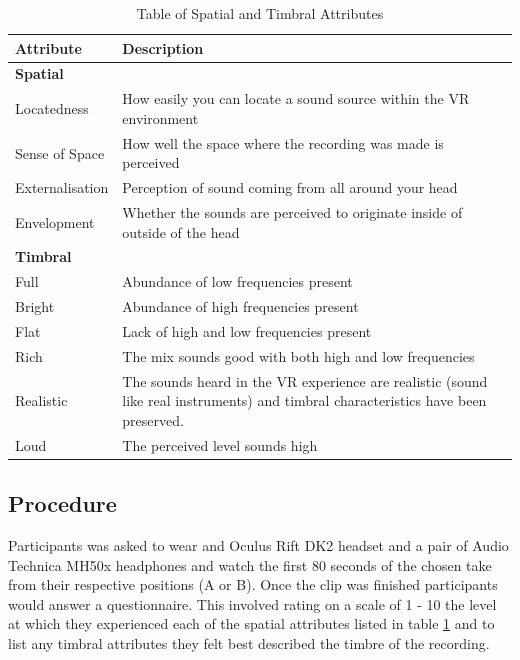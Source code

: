 \documentclass{aes2e}
\begin{document}
		\begin{table}[h]
			\begin{tabular}{m{2.2cm} | m{}}
				\textbf{Attribute} & \textbf{Description} \\ \hline
				\multicolumn{2}{l}{\textbf{Spatial}} \\ \hline
				Locatedness & How easily you can locate a sound source within the VR environment \\
				Sense of Space & How well the space where the recording was made is perceived \\
				Externalisation & Perception of sound coming from all around your head \\
				Envelopment & Whether the sounds are perceived to originate inside of outside of the head \\ \hline
				\multicolumn{2}{l}{\textbf{Timbral}} \\ \hline
				Full & Abundance of low frequencies present \\
				Bright & Abundance of high frequencies present \\
				Flat & Lack of high and low frequencies present \\
				Rich & The mix sounds good with both high and low frequencies \\
				Realistic & The sounds heard in the VR experience are realistic (sound like real instruments) and timbral characteristics have been preserved. \\
				Loud & The perceived level sounds high
			\end{tabular}
			\caption{Table of Spatial and Timbral Attributes}
			\label{table:attTable}
		\end{table} 
			

	\subsection{Procedure}

		Participants was asked to wear and Oculus Rift DK2 headset and a pair of Audio Technica MH50x headphones and watch the first 80 seconds of the chosen take from their respective positions (A or B). Once the clip was finished participants would answer a questionnaire. This involved rating on a scale of 1 - 10 the level at which they experienced each of the spatial attributes listed in table \ref{table:attTable} and to list any timbral attributes they felt best described the timbre of the recording. 
\end{document}
